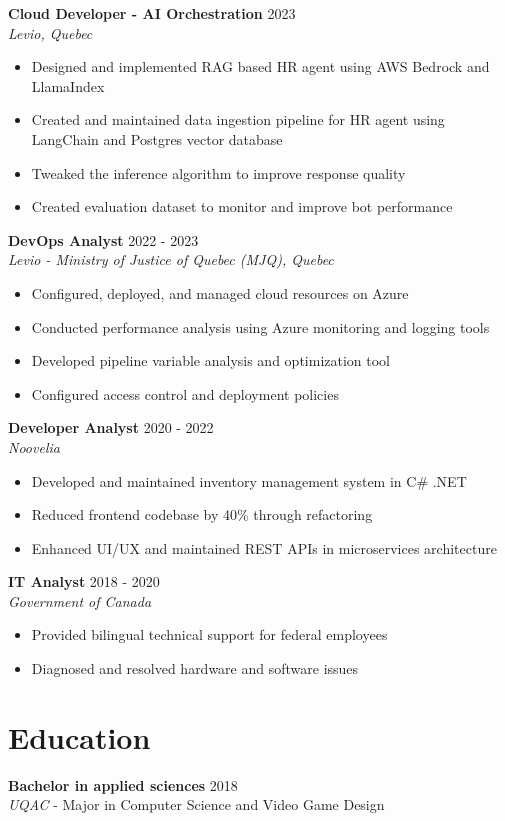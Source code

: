 ﻿\documentclass[11pt,letterpaper]{article}
\begin{document}
\textbf{Cloud Developer - AI Orchestration} \hfill 2023\\
\textit{Levio, Quebec}
\begin{itemize}
\item Designed and implemented RAG based HR agent using AWS Bedrock and LlamaIndex
\item Created and maintained data ingestion pipeline for HR agent using LangChain and Postgres vector database
\item Tweaked the inference algorithm to improve response quality
\item Created evaluation dataset to monitor and improve bot performance
\end{itemize}

\textbf{DevOps Analyst} \hfill 2022 - 2023\\
\textit{Levio - Ministry of Justice of Quebec (MJQ), Quebec}
\begin{itemize}
\item Configured, deployed, and managed cloud resources on Azure
\item Conducted performance analysis using Azure monitoring and logging tools
\item Developed pipeline variable analysis and optimization tool
\item Configured access control and deployment policies
\end{itemize}

\textbf{Developer Analyst} \hfill 2020 - 2022\\
\textit{Noovelia}
\begin{itemize}
\item Developed and maintained inventory management system  in C\# .NET
\item Reduced frontend codebase by 40\% through refactoring
\item Enhanced UI/UX and maintained REST APIs in microservices architecture
\end{itemize}

\textbf{IT Analyst} \hfill 2018 - 2020\\
\textit{Government of Canada}
\begin{itemize}
\item Provided bilingual technical support for federal employees
\item Diagnosed and resolved hardware and software issues
\end{itemize}

\section*{Education}
\textbf{Bachelor in applied sciences} \hfill 2018\\
\textit{UQAC} - Major in Computer Science and Video Game Design
\end{document}
